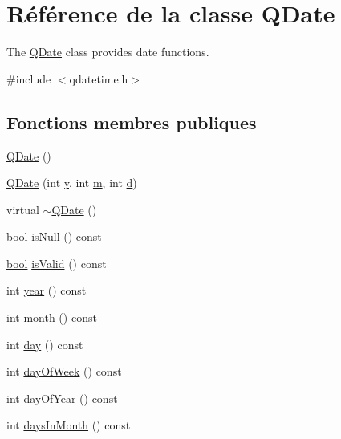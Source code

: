 \hypertarget{class_q_date}{}\section{Référence de la classe Q\+Date}
\label{class_q_date}


The \hyperlink{class_q_date}{Q\+Date} class provides date functions.  




{\ttfamily \#include $<$qdatetime.\+h$>$}

\subsection*{Fonctions membres publiques}
\begin{DoxyCompactItemize}
\item 
\hyperlink{class_q_date_ac553172d4c172c75bb78e9b246eaa0a1}{Q\+Date} ()
\item 
\hyperlink{class_q_date_abaf62f540ece3f5da8a7fa61298c34f3}{Q\+Date} (int \hyperlink{058__bracket__recursion_8tcl_a2fb1c5cf58867b5bbc9a1b145a86f3a0}{y}, int \hyperlink{060__command__switch_8tcl_a78d127e8bda64d4471ac811ad512fbd9}{m}, int \hyperlink{060__command__switch_8tcl_af43f4b1f0064a33b2d662af9f06d3a00}{d})
\item 
virtual \hyperlink{class_q_date_afc0a2ef784bb8a42492fa35c82f0a548}{$\sim$\+Q\+Date} ()
\item 
\hyperlink{qglobal_8h_a1062901a7428fdd9c7f180f5e01ea056}{bool} \hyperlink{class_q_date_a610f089043b944cddab8b547f2a0a218}{is\+Null} () const 
\item 
\hyperlink{qglobal_8h_a1062901a7428fdd9c7f180f5e01ea056}{bool} \hyperlink{class_q_date_adc39b5ef83613cc352832fe233e8baef}{is\+Valid} () const 
\item 
int \hyperlink{class_q_date_a88d2a135c6094f3e67cd1d125931dda5}{year} () const 
\item 
int \hyperlink{class_q_date_a1b00f4cc57ae72ea2669650833873ea2}{month} () const 
\item 
int \hyperlink{class_q_date_aa66120bb558e981ac505d0fa4113a844}{day} () const 
\item 
int \hyperlink{class_q_date_adea77eac7776e9441c9107f4b15528ce}{day\+Of\+Week} () const 
\item 
int \hyperlink{class_q_date_a62e2463ded1a429298b00d2c6ca225b0}{day\+Of\+Year} () const 
\item 
int \hyperlink{class_q_date_acd3874ea22ceb913d3af9a57c855ef83}{days\+In\+Month} () const 
\item 

\end{DoxyCompactItemize}
